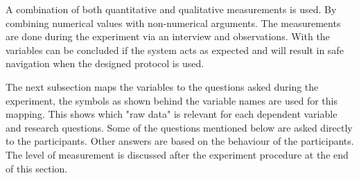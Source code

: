 A combination of both quantitative and qualitative measurements is used. By combining numerical values with non-numerical arguments. The measurements are done during the experiment via an interview and observations. With the variables can be concluded if the system acts as expected and will result in safe navigation when the designed protocol is used. 

The next subsection maps the variables to the questions asked during the experiment, the symbols as shown behind the variable names are used for this mapping. This shows which "raw data" is relevant for each dependent variable and research questions. Some of the questions mentioned below are asked directly to the participants. Other answers are based on the behaviour of the participants. The level of measurement is discussed after the experiment procedure at the end of this section.

